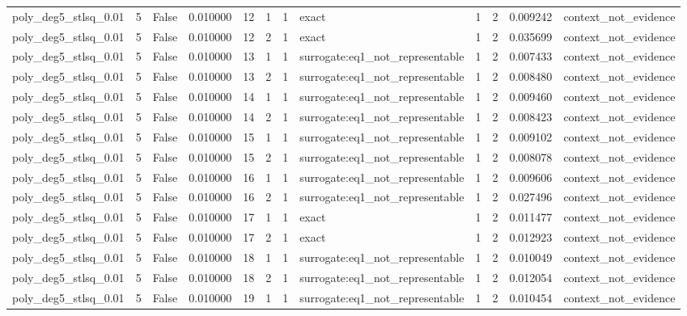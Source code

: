 \begin{tabular}{lrrrrrrlrrrl}
poly\_deg5\_stlsq\_0.01 & 5 & False & 0.010000 & 12 & 1 & 1 & exact & 1 & 2 & 0.009242 & context\_not\_evidence \\
poly\_deg5\_stlsq\_0.01 & 5 & False & 0.010000 & 12 & 2 & 1 & exact & 1 & 2 & 0.035699 & context\_not\_evidence \\
poly\_deg5\_stlsq\_0.01 & 5 & False & 0.010000 & 13 & 1 & 1 & surrogate:eq1\_not\_representable & 1 & 2 & 0.007433 & context\_not\_evidence \\
poly\_deg5\_stlsq\_0.01 & 5 & False & 0.010000 & 13 & 2 & 1 & surrogate:eq1\_not\_representable & 1 & 2 & 0.008480 & context\_not\_evidence \\
poly\_deg5\_stlsq\_0.01 & 5 & False & 0.010000 & 14 & 1 & 1 & surrogate:eq1\_not\_representable & 1 & 2 & 0.009460 & context\_not\_evidence \\
poly\_deg5\_stlsq\_0.01 & 5 & False & 0.010000 & 14 & 2 & 1 & surrogate:eq1\_not\_representable & 1 & 2 & 0.008423 & context\_not\_evidence \\
poly\_deg5\_stlsq\_0.01 & 5 & False & 0.010000 & 15 & 1 & 1 & surrogate:eq1\_not\_representable & 1 & 2 & 0.009102 & context\_not\_evidence \\
poly\_deg5\_stlsq\_0.01 & 5 & False & 0.010000 & 15 & 2 & 1 & surrogate:eq1\_not\_representable & 1 & 2 & 0.008078 & context\_not\_evidence \\
poly\_deg5\_stlsq\_0.01 & 5 & False & 0.010000 & 16 & 1 & 1 & surrogate:eq1\_not\_representable & 1 & 2 & 0.009606 & context\_not\_evidence \\
poly\_deg5\_stlsq\_0.01 & 5 & False & 0.010000 & 16 & 2 & 1 & surrogate:eq1\_not\_representable & 1 & 2 & 0.027496 & context\_not\_evidence \\
poly\_deg5\_stlsq\_0.01 & 5 & False & 0.010000 & 17 & 1 & 1 & exact & 1 & 2 & 0.011477 & context\_not\_evidence \\
poly\_deg5\_stlsq\_0.01 & 5 & False & 0.010000 & 17 & 2 & 1 & exact & 1 & 2 & 0.012923 & context\_not\_evidence \\
poly\_deg5\_stlsq\_0.01 & 5 & False & 0.010000 & 18 & 1 & 1 & surrogate:eq1\_not\_representable & 1 & 2 & 0.010049 & context\_not\_evidence \\
poly\_deg5\_stlsq\_0.01 & 5 & False & 0.010000 & 18 & 2 & 1 & surrogate:eq1\_not\_representable & 1 & 2 & 0.012054 & context\_not\_evidence \\
poly\_deg5\_stlsq\_0.01 & 5 & False & 0.010000 & 19 & 1 & 1 & surrogate:eq1\_not\_representable & 1 & 2 & 0.010454 & context\_not\_evidence \\

\end{tabular}
